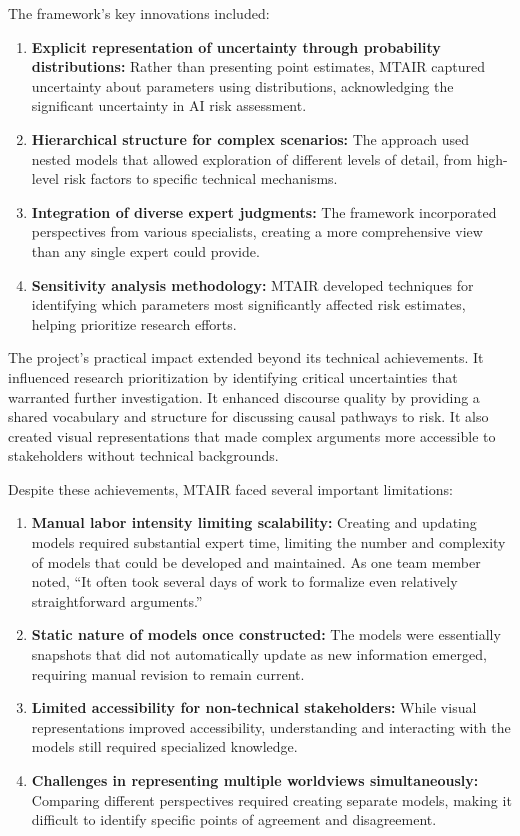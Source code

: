 \documentclass[
  11pt,
  letterpaper,
]{book}
\begin{document}
The framework's key innovations included:

\begin{enumerate}
\def\labelenumi{\arabic{enumi}.}
\item
  \textbf{Explicit representation of uncertainty through probability
  distributions:} Rather than presenting point estimates, MTAIR captured
  uncertainty about parameters using distributions, acknowledging the
  significant uncertainty in AI risk assessment.
\item
  \textbf{Hierarchical structure for complex scenarios:} The approach
  used nested models that allowed exploration of different levels of
  detail, from high-level risk factors to specific technical mechanisms.
\item
  \textbf{Integration of diverse expert judgments:} The framework
  incorporated perspectives from various specialists, creating a more
  comprehensive view than any single expert could provide.
\item
  \textbf{Sensitivity analysis methodology:} MTAIR developed techniques
  for identifying which parameters most significantly affected risk
  estimates, helping prioritize research efforts.
\end{enumerate}

The project's practical impact extended beyond its technical
achievements. It influenced research prioritization by identifying
critical uncertainties that warranted further investigation. It enhanced
discourse quality by providing a shared vocabulary and structure for
discussing causal pathways to risk. It also created visual
representations that made complex arguments more accessible to
stakeholders without technical backgrounds.

Despite these achievements, MTAIR faced several important limitations:

\begin{enumerate}
\def\labelenumi{\arabic{enumi}.}
\item
  \textbf{Manual labor intensity limiting scalability:} Creating and
  updating models required substantial expert time, limiting the number
  and complexity of models that could be developed and maintained. As
  one team member noted, ``It often took several days of work to
  formalize even relatively straightforward arguments.''
\item
  \textbf{Static nature of models once constructed:} The models were
  essentially snapshots that did not automatically update as new
  information emerged, requiring manual revision to remain current.
\item
  \textbf{Limited accessibility for non-technical stakeholders:} While
  visual representations improved accessibility, understanding and
  interacting with the models still required specialized knowledge.
\item
  \textbf{Challenges in representing multiple worldviews
  simultaneously:} Comparing different perspectives required creating
  separate models, making it difficult to identify specific points of
  agreement and disagreement.
\end{enumerate}
\end{document}
